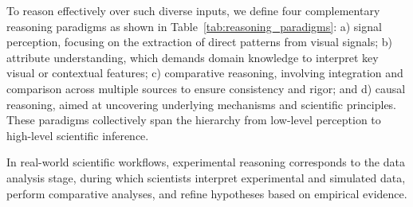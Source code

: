 To reason effectively over such diverse inputs, we define four complementary reasoning paradigms as shown in Table~\ref{tab:reasoning_paradigms}: a) signal perception, focusing on the extraction of direct patterns from visual signals; b) attribute understanding, which demands domain knowledge to interpret key visual or contextual features; c) comparative reasoning, involving integration and comparison across multiple sources to ensure consistency and rigor; and d) causal reasoning, aimed at uncovering underlying mechanisms and scientific principles. These paradigms collectively span the hierarchy from low-level perception to high-level scientific inference.

\begin{table}[ht]
\centering
\caption{\textbf{Experimental Reasoning Paradigms}: Four reasoning paradigms spanning perception to causality with examples and requirements.}
\label{tab:reasoning_paradigms}
\end{table}

In real-world scientific workflows, experimental reasoning corresponds to the data analysis stage, during which scientists interpret experimental and simulated data, perform comparative analyses, and refine hypotheses based on empirical evidence.

